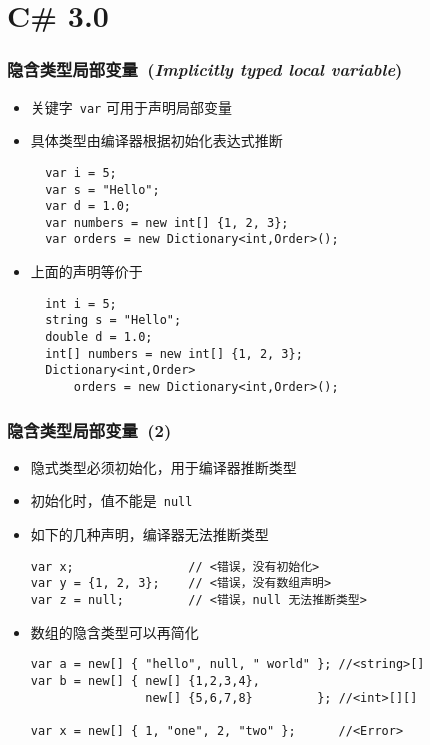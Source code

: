 
\section{C\# 3.0}

\begin{frame}[fragile]
\frametitle{隐含类型局部变量~(\textit{Implicitly typed local variable})}

\begin{itemize}
\item 关键字~\texttt{var} 可用于声明局部变量
\item 具体类型由编译器根据初始化表达式推断
\begin{lstlisting}
  var i = 5;
  var s = "Hello";
  var d = 1.0;
  var numbers = new int[] {1, 2, 3};
  var orders = new Dictionary<int,Order>();
\end{lstlisting}
\pause
\item 上面的声明等价于
\begin{lstlisting}
  int i = 5;
  string s = "Hello";
  double d = 1.0;
  int[] numbers = new int[] {1, 2, 3};
  Dictionary<int,Order>
      orders = new Dictionary<int,Order>();
\end{lstlisting}
\end{itemize}
\end{frame}

\begin{frame}[fragile]
\frametitle{隐含类型局部变量~(2)}
\begin{itemize}
\item 隐式类型必须初始化，用于编译器推断类型
\item 初始化时，值不能是~\texttt{null}
\item 如下的几种声明，编译器无法推断类型
\begin{lstlisting}[escapeinside=<>]
var x;                // <错误，没有初始化>
var y = {1, 2, 3};    // <错误，没有数组声明>
var z = null;         // <错误，null 无法推断类型>
\end{lstlisting}
\pause
\item 数组的隐含类型可以再简化
\begin{lstlisting}
var a = new[] { "hello", null, " world" }; //<string>[]
var b = new[] { new[] {1,2,3,4},
                new[] {5,6,7,8}         }; //<int>[][]

var x = new[] { 1, "one", 2, "two" };      //<Error>
\end{lstlisting}
\end{itemize}
\end{frame}

